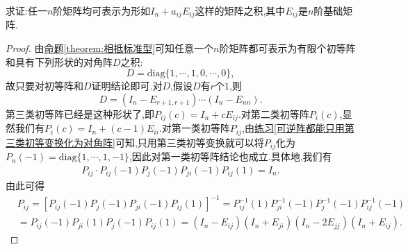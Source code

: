 \documentclass[../../main.tex]{subfiles}
\begin{document}
\begin{exercise}
求证:任一\(n\)阶矩阵均可表示为形如\(I_n + a_{ij}E_{ij}\)这样的矩阵之积,其中\(E_{ij}\)是\(n\)阶基础矩阵.
\end{exercise}
\begin{proof}
由\hyperref[theorem:相抵标准型]{命题\ref{theorem:相抵标准型}}可知任意一个\(n\)阶矩阵都可表示为有限个初等阵和具有下列形状的对角阵\(D\)之积:
\[
D = \mathrm{diag}\{1,\cdots,1,0,\cdots,0\},
\]
故只要对初等阵和\(D\)证明结论即可.对\(D\),假设\(D\)有\(r\)个\(1\),则
\[
D = (I_n - E_{r + 1,r + 1})\cdots(I_n - E_{nn}).
\]
第三类初等阵已经是这种形状了,即$P_{ij}\left( c \right) =I_n+cE_{ij}$.对第二类初等阵\(P_i(c)\),显然我们有\(P_i(c) = I_n + (c - 1)E_{ii}\).对第一类初等阵\(P_{ij}\),由\hyperref[可逆阵都能只用第三类初等变换化为对角阵]{练习\ref{可逆阵都能只用第三类初等变换化为对角阵}}可知,只用第三类初等变换就可以将\(P_{ij}\)化为\(P_n(-1) = \mathrm{diag}\{1,\cdots,1,-1\}\),因此对第一类初等阵结论也成立.具体地,我们有
\begin{align*}
P_{ij}\cdot P_{ij}\left( -1 \right) P_j\left( -1 \right) P_{ji}\left( -1 \right) P_{ij}\left( 1 \right) =I_n. 
\end{align*}
由此可得
\begin{align*}
&P_{ij}=\left[ P_{ij}\left( -1 \right) P_j\left( -1 \right) P_{ji}\left( -1 \right) P_{ij}\left( 1 \right) \right] ^{-1}=P_{ij}^{-1}\left( 1 \right) P_{ji}^{-1}\left( -1 \right) P_{j}^{-1}\left( -1 \right) P_{ij}^{-1}\left( -1 \right) 
\\
&=P_{ij}\left( -1 \right) P_{ji}\left( 1 \right) P_j\left( -1 \right) P_{ij}\left( 1 \right) =\left( I_n-E_{ij} \right) \left( I_n+E_{ji} \right) \left( I_n-2E_{jj} \right) \left( I_n+E_{ij} \right) .
\end{align*}
\end{proof}
\end{document}
